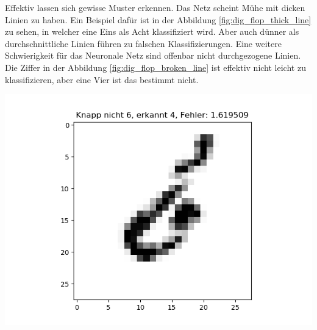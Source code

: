 \documentclass[Interploate_hadwritten_Digits.tex]{subfiles}
\begin{document}
	Effektiv lassen sich gewisse Muster erkennen. Das Netz scheint Mühe mit dicken Linien zu haben. Ein Beispiel dafür ist in der Abbildung \ref{fig:dig_flop_thick_line} zu sehen, in welcher eine Eins als Acht klassifiziert wird. Aber auch dünner als durchschnittliche Linien führen zu falschen Klassifizierungen. Eine weitere Schwierigkeit für das Neuronale Netz sind offenbar nicht durchgezogene Linien. Die Ziffer in der Abbildung \ref{fig:dig_flop_broken_line} ist effektiv nicht leicht zu klassifizieren, aber eine Vier ist das bestimmt nicht. 
	\begin{Figure}
		\centering
		\includegraphics[width=\linewidth]{img/classification_analysis/flop_6_1}
		\label{fig:dig_flop_broken_line}
	\end{Figure}
\end{document}
